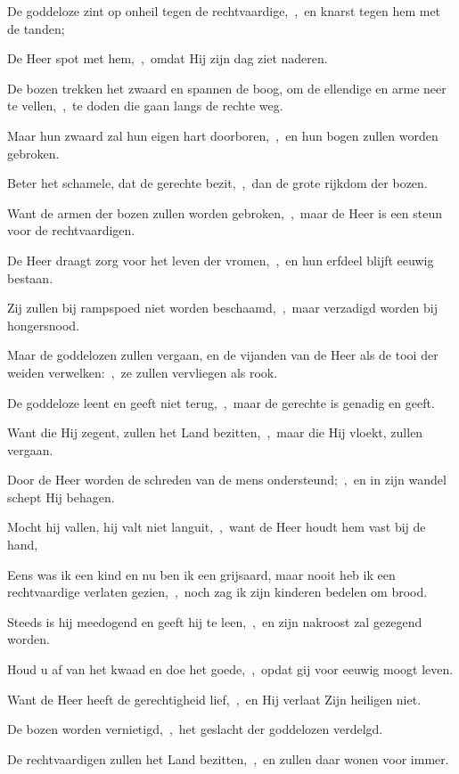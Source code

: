 \documentclass[12pt,twoside,a5paper]{article}
\begin{document}
\begin{halfparskip}
  De goddeloze zint op onheil tegen de rechtvaardige,~\sep\ en knarst tegen hem met de tanden;

  De Heer spot met hem,~\sep\ omdat Hij zijn dag ziet naderen.

  De bozen trekken het zwaard en spannen de boog, om de ellendige en arme neer te vellen,~\sep\ te doden die gaan langs de rechte weg.

  Maar hun zwaard zal hun eigen hart doorboren,~\sep\ en hun bogen zullen worden gebroken.

  Beter het schamele, dat de gerechte bezit,~\sep\ dan de grote rijkdom der bozen.

  Want de armen der bozen zullen worden gebroken,~\sep\ maar de Heer is een steun voor de rechtvaardigen.

  De Heer draagt zorg voor het leven der vromen,~\sep\ en hun erfdeel blijft eeuwig bestaan.

  Zij zullen bij rampspoed niet worden beschaamd,~\sep\ maar verzadigd worden bij hongersnood.

  Maar de goddelozen zullen vergaan, en de vijanden van de Heer als de tooi der weiden verwelken:~\sep\ ze zullen vervliegen als rook.

  De goddeloze leent en geeft niet terug,~\sep\ maar de gerechte is genadig en geeft.
\end{halfparskip}


\begin{halfparskip}
  Want die Hij zegent, zullen het Land bezitten,~\sep\ maar die Hij vloekt, zullen vergaan.

  Door de Heer worden de schreden van de mens ondersteund;~\sep\ en in zijn wandel schept Hij behagen.

  Mocht hij vallen, hij valt niet languit,~\sep\ want de Heer houdt hem vast bij de hand,

  Eens was ik een kind en nu ben ik een grijsaard, maar nooit heb ik een rechtvaardige verlaten gezien,~\sep\ noch zag ik zijn kinderen bedelen om brood.

  Steeds is hij meedogend en geeft hij te leen,~\sep\ en zijn nakroost zal gezegend worden.

  Houd u af van het kwaad en doe het goede,~\sep\ opdat gij voor eeuwig moogt leven.

  Want de Heer heeft de gerechtigheid lief,~\sep\ en Hij verlaat Zijn heiligen niet.

  De bozen worden vernietigd,~\sep\ het geslacht der goddelozen verdelgd.

  De rechtvaardigen zullen het Land bezitten,~\sep\ en zullen daar wonen voor immer.
\end{halfparskip}
\end{document}
